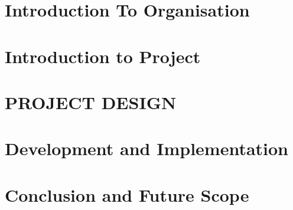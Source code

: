 \documentclass[12pt,includeheadfoot,a4paper]{report}
\begin{document}


\thispagestyle{empty}
\pagetitle
\newpage
{}
\cfoot{\thepage}



\newpage


\newpage
\tableofcontents
\newpage
\listoffigures
\newpage
\listoftables
\newpage


\cfoot{\thepage}


\newpage

\chapter{Introduction To Organisation}


\newpage

\chapter{Introduction to Project}



\chapter{PROJECT DESIGN}












%
%
%


%

\chapter{Development and Implementation}







\chapter{Conclusion and Future Scope}


%


\end{document}
